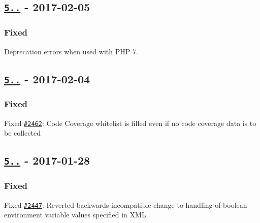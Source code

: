\subsection*{\href{https://github.com/sebastianbergmann/phpunit/compare/5.7.10...5.7.11}{\tt 5..} -\/ 2017-\/02-\/05}

\subsubsection*{Fixed}


\begin{DoxyItemize}
\item Deprecation errors when used with P\+HP 7.
\end{DoxyItemize}

\subsection*{\href{https://github.com/sebastianbergmann/phpunit/compare/5.7.9...5.7.10}{\tt 5..} -\/ 2017-\/02-\/04}

\subsubsection*{Fixed}


\begin{DoxyItemize}
\item Fixed \href{https://github.com/sebastianbergmann/phpunit/issues/2462}{\tt \#2462}\+: Code Coverage whitelist is filled even if no code coverage data is to be collected
\end{DoxyItemize}

\subsection*{\href{https://github.com/sebastianbergmann/phpunit/compare/5.7.8...5.7.9}{\tt 5..} -\/ 2017-\/01-\/28}

\subsubsection*{Fixed}


\begin{DoxyItemize}
\item Fixed \href{https://github.com/sebastianbergmann/phpunit/issues/2447}{\tt \#2447}\+: Reverted backwards incompatible change to handling of boolean environment variable values specified in X\+ML
\end{DoxyItemize}

